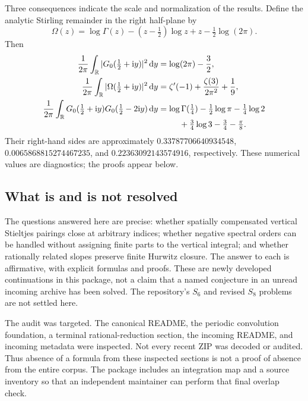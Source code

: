 \documentclass[11pt,a4paper]{article}
\theoremstyle{definition}
\numberwithin{equation}{section}
\newcommand{\R}{\mathbb R}
\newcommand{\dd}{\,\mathrm d}
\newcommand{\ii}{\mathrm i}
\begin{document}
Three consequences indicate the scale and normalization of the results.
Define the analytic Stirling remainder in the right half-plane by
\begin{equation}\label{eq:Omega-intro}
 \Omega(z)=\log\Gamma(z)-(z-\tfrac12)\log z+z-\tfrac12\log(2\pi).
\end{equation}
Then
\begin{align}
 \frac1{2\pi}\int_{\R}
   |G_0(\tfrac12+\ii y)|^2\dd y
   &=\log(2\pi)-\frac32,\label{eq:headline-digamma}\\
 \frac1{2\pi}\int_{\R}
   |\Omega(\tfrac12+\ii y)|^2\dd y
   &=\zeta'(-1)+\frac{\zeta(3)}{2\pi^2}+\frac19,
       \label{eq:headline-stirling}\\
 \frac1{2\pi}\int_{\R}
    G_0(\tfrac12+\ii y)G_0(\tfrac12-2\ii y)\dd y
   &=\log\Gamma(\tfrac14)-\tfrac12\log\pi-\tfrac14\log2
       \notag\\[-1mm]
   &\hspace{9mm}+\tfrac34\log3-\tfrac34-\tfrac\pi8.
       \label{eq:headline-quarter}
\end{align}
Their right-hand sides are approximately $0.33787706640934548$,
$0.0065868815274467235$, and $0.22363092143574916$, respectively.
These numerical values are diagnostics; the proofs appear below.

\subsection{What is and is not resolved}
The questions answered here are precise: whether spatially compensated
vertical Stieltjes pairings close at arbitrary indices; whether negative
spectral orders can be handled without assigning finite parts to the
vertical integral; and whether rationally related slopes preserve finite
Hurwitz closure. The answer to each is affirmative, with explicit formulas
and proofs. These are newly developed continuations in this package, not a
claim that a named conjecture in an unread incoming archive has been solved.
The repository's $S_6$ and revised $S_8$ problems are not settled here.

The audit was targeted. The canonical README, the periodic convolution
foundation, a terminal rational-reduction section, the incoming README,
and incoming metadata were inspected. Not every recent ZIP was decoded or
audited. Thus absence of a formula from these inspected sections is not a
proof of absence from the entire corpus. The package includes an integration
map and a source inventory so that an independent maintainer can perform
that final overlap check.
\end{document}
